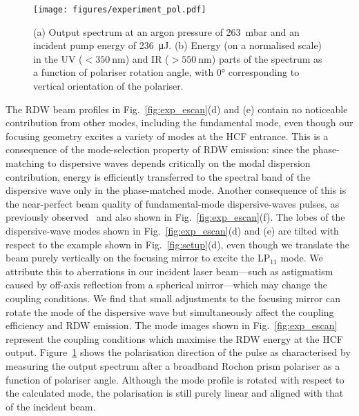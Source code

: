\documentclass[amsmath, preprint, floatfix]{revtex4-2}
\begin{document}
\begin{figure}
    \centering
    \texttt{[image: figures/experiment\_pol.pdf]}
    \caption{(a) Output spectrum at an argon pressure of \SI{263}{\milli\bar} and an incident pump energy of \SI{236}{\micro\joule}. (b) Energy (on a normalised scale) in the UV ($<\SI{350}{\nm}$) and IR ($>\SI{550}{\nm}$) parts of the spectrum as a function of polariser rotation angle, with \ang{0} corresponding to vertical orientation of the polariser.}
    \label{fig:pol}
\end{figure}

The RDW beam profiles in Fig.~\ref{fig:exp_escan}(d) and (e) contain no noticeable contribution from other modes, including the fundamental mode, even though our focusing geometry excites a variety of modes at the HCF entrance. This is a consequence of the mode-selection property of RDW emission: since the phase-matching to dispersive waves depends critically on the modal dispersion contribution, energy is efficiently transferred to the spectral band of the dispersive wave only in the phase-matched mode. Another consequence of this is the near-perfect beam quality of fundamental-mode dispersive-waves pulses, as previously observed~\cite{travers_high-energy_2019} and also shown in Fig.~\ref{fig:exp_escan}(f). The lobes of the dispersive-wave modes shown in Fig.~\ref{fig:exp_escan}(d) and (e) are tilted with respect to the example shown in Fig.~\ref{fig:setup}(d), even though we translate the beam purely vertically on the focusing mirror to excite the LP$_{11}$ mode. We attribute this to aberrations in our incident laser beam---such as astigmatism caused by off-axis reflection from a spherical mirror---which may change the coupling conditions. We find that small adjustments to the focusing mirror can rotate the mode of the dispersive wave but simultaneously affect the coupling efficiency and RDW emission. The mode images shown in Fig.~\ref{fig:exp_escan} represent the coupling conditions which maximise the RDW energy at the HCF output. Figure~\ref{fig:pol} shows the polarisation direction of the pulse as characterised by measuring the output spectrum after a broadband Rochon prism polariser as a function of polariser angle. Although the mode profile is rotated with respect to the calculated mode, the polarisation is still purely linear and aligned with that of the incident beam.
\end{document}
